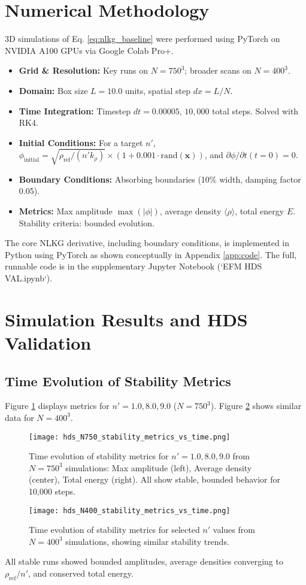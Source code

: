 \documentclass[11pt]{article}
\begin{document}
\section{Numerical Methodology}
3D simulations of Eq. \ref{eq:nlkg_baseline} were performed using PyTorch on NVIDIA A100 GPUs via Google Colab Pro+.
\begin{itemize}
    \item \textbf{Grid \& Resolution:} Key runs on \(N=750^3\); broader scans on \(N=400^3\).
    \item \textbf{Domain:} Box size \(L = 10.0\) units, spatial step \(dx = L/N\).
    \item \textbf{Time Integration:} Timestep \(dt = 0.00005\), \(10,000\) total steps. Solved with RK4.
    \item \textbf{Initial Conditions:} For a target \(n'\), \(\phi_{\text{initial}} = \sqrt{\rho_{\text{ref}}/(n' k_{\rho})} \times (1 + 0.001 \cdot \text{rand}(\mathbf{x}))\), and \(\partial\phi/\partial t (t=0) = 0\).
    \item \textbf{Boundary Conditions:} Absorbing boundaries (10\% width, damping factor 0.05).
    \item \textbf{Metrics:} Max amplitude \(\max(|\phi|)\), average density \(\langle\rho\rangle\), total energy \(E\). Stability criteria: bounded evolution.
\end{itemize}
The core NLKG derivative, including boundary conditions, is implemented in Python using PyTorch as shown conceptually in Appendix \ref{app:code}. The full, runnable code is in the supplementary Jupyter Notebook (`EFM HDS VAL.ipynb`).

\section{Simulation Results and HDS Validation}

\subsection{Time Evolution of Stability Metrics}
Figure \ref{fig:hds_metrics_time_N750} displays metrics for \(n' = 1.0, 8.0, 9.0\) (\(N=750^3\)). Figure \ref{fig:hds_metrics_time_N400} shows similar data for \(N=400^3\).
\begin{figure}[htbp]
    \centering
    \texttt{[image: hds\_N750\_stability\_metrics\_vs\_time.png]}
    \caption{Time evolution of stability metrics for \(n' = 1.0, 8.0, 9.0\) from \(N=750^3\) simulations: Max amplitude (left), Average density (center), Total energy (right). All show stable, bounded behavior for 10,000 steps.}
    \label{fig:hds_metrics_time_N750}
\end{figure}
\begin{figure}[htbp]
    \centering
    \texttt{[image: hds\_N400\_stability\_metrics\_vs\_time.png]}
    \caption{Time evolution of stability metrics for selected \(n'\) values from \(N=400^3\) simulations, showing similar stability trends.}
    \label{fig:hds_metrics_time_N400}
\end{figure}
All stable runs showed bounded amplitudes, average densities converging to \(\rho_{\text{ref}}/n'\), and conserved total energy.
\end{document}
